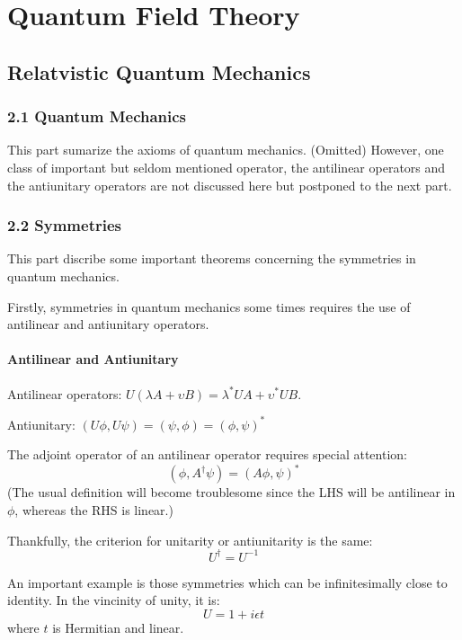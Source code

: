 \documentclass{article}
\numberwithin{equation}{subsection} %
\theoremstyle{definition}
\begin{document}

\section{Quantum Field Theory}
\label{sec:Quantum_Field_Theory}
    \subsection{Relatvistic Quantum Mechanics}
    \label{sec:Relatvistic_Quantum_Mechanics}
    
    \subsubsection{2.1 Quantum Mechanics}
    \label{sec:2.1_Quantum_Mechanics}
    This part sumarize the axioms of quantum mechanics. (Omitted)
    However, one class of important but seldom mentioned operator,
    the antilinear operators and the antiunitary operators are not
    discussed here but postponed to the next part.

    \subsubsection{2.2 Symmetries}
    \label{sec:2.2_Symmetries}
    This part discribe some important theorems concerning the symmetries
    in quantum mechanics.

    Firstly, symmetries in quantum mechanics some times requires the use
    of antilinear and antiunitary operators.

    \paragraph{Antilinear and Antiunitary}
    Antilinear operators: $U (\lambda A + \upsilon B)
                            = \lambda^* UA + \upsilon^* UB$.

    Antiunitary: $ (U \phi, U \psi) = (\psi, \phi) = (\phi,\psi)^*$

    The adjoint operator of an antilinear operator requires special
    attention:
    $$ (\phi, A^\dagger\psi) = (A\phi, \psi)^*$$
    (The usual definition will become troublesome since the LHS will
    be antilinear in $\phi$, whereas the RHS is linear.)

    Thankfully, the criterion for unitarity or antiunitarity is the same:
    $$U^\dagger = U^{-1}$$
    
    An important example is those symmetries which can be infinitesimally
    close to identity. In the vincinity of unity, it is:
    $$ U =1+i\epsilon t $$
    where $t$ is Hermitian and linear.
\end{document}
